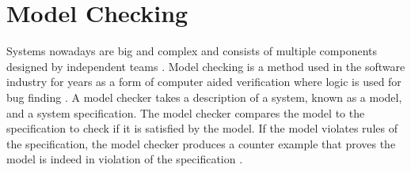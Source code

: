 \section{Model Checking}\label{sec:model-checking}

Systems nowadays are big and complex and consists of multiple components designed by independent teams \cite{ecdartheory}. Model checking is a method used in the software industry for years as a form of computer aided verification where logic is used for bug finding \cite{modelchecking_handbook}. A model checker takes a description of a system, known as a model, and a system specification. The model checker compares the model to the specification to check if it is satisfied by the model. If the model violates rules of the specification, the model checker produces a counter example that proves the model is indeed in violation of the specification  \cite{modelchecking_handbook}.

